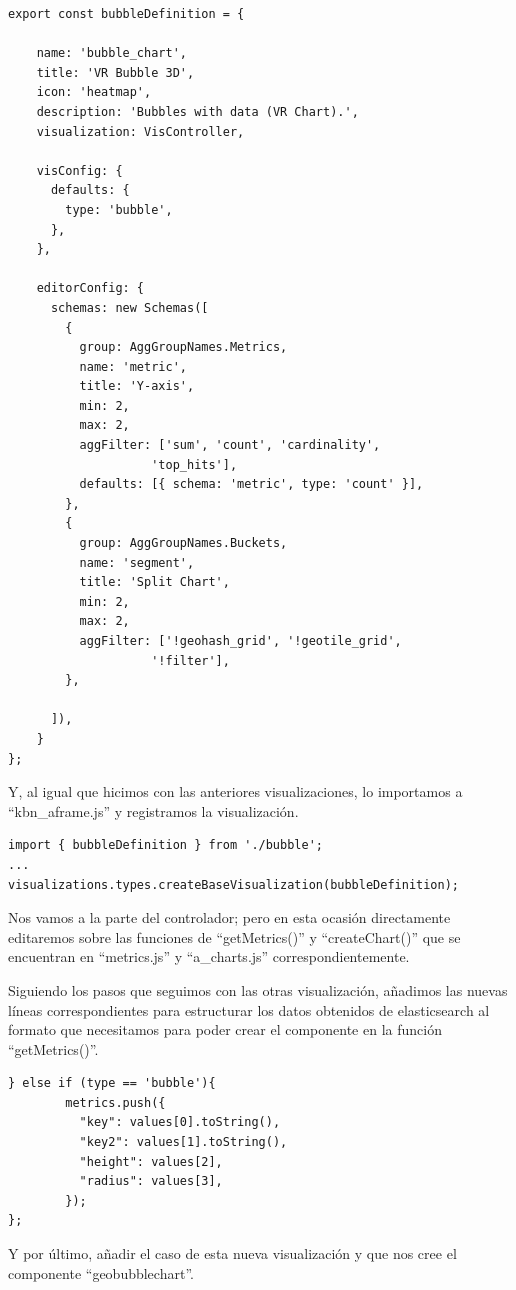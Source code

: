 \documentclass[a4paper, 12pt]{book}
\begin{document}
\begin{lstlisting}[frame=single]
export const bubbleDefinition = {

    name: 'bubble_chart',
    title: 'VR Bubble 3D',
    icon: 'heatmap',
    description: 'Bubbles with data (VR Chart).',
    visualization: VisController,

    visConfig: {
      defaults: {
        type: 'bubble',
      },
    },

    editorConfig: {
      schemas: new Schemas([
        {
          group: AggGroupNames.Metrics,
          name: 'metric',
          title: 'Y-axis',
          min: 2,
          max: 2,
          aggFilter: ['sum', 'count', 'cardinality', 
                    'top_hits'],
          defaults: [{ schema: 'metric', type: 'count' }],
        },
        {
          group: AggGroupNames.Buckets,
          name: 'segment',
          title: 'Split Chart',
          min: 2,
          max: 2,
          aggFilter: ['!geohash_grid', '!geotile_grid', 
                    '!filter'],
        },

      ]),
    }
};
\end{lstlisting}

Y, al igual que hicimos con las anteriores visualizaciones, lo importamos a “kbn\_aframe.js” y registramos la visualización.

\begin{lstlisting}[frame=single]
import { bubbleDefinition } from './bubble';
...
visualizations.types.createBaseVisualization(bubbleDefinition);
\end{lstlisting}

Nos vamos a la parte del controlador; pero en esta ocasión directamente editaremos sobre las funciones de “getMetrics()” y “createChart()” que se encuentran en “metrics.js” y “a\_charts.js” correspondientemente.

Siguiendo los pasos que seguimos con las otras visualización, añadimos las nuevas líneas correspondientes para estructurar los datos obtenidos de elasticsearch al formato que necesitamos para poder crear el componente en la función “getMetrics()”.

\begin{lstlisting}[frame=single]
} else if (type == 'bubble'){
        metrics.push({
          "key": values[0].toString(),
          "key2": values[1].toString(),
          "height": values[2],
          "radius": values[3],
        });
};
\end{lstlisting}

Y por último, añadir el caso de esta nueva visualización y que nos cree el componente “geobubblechart”.
\end{document}
